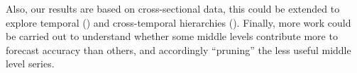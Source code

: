 \documentclass[a4paper,review,12pt,authoryear]{elsarticle}
\begin{document}
Also, our results are based on cross-sectional data, this could be extended to explore temporal (\citealp{athanasopoulosForecastingTemporalHierarchies2017}) and cross-temporal hierarchies (\citealp{girolimettoCrosstemporalProbabilisticForecast2023a}). Finally, more work could be carried out to understand whether some middle levels contribute more to forecast accuracy than others, and accordingly ``pruning'' the less useful middle level series.



\clearpage 
\newpage 




\begingroup
{}


\endgroup
\end{document}
